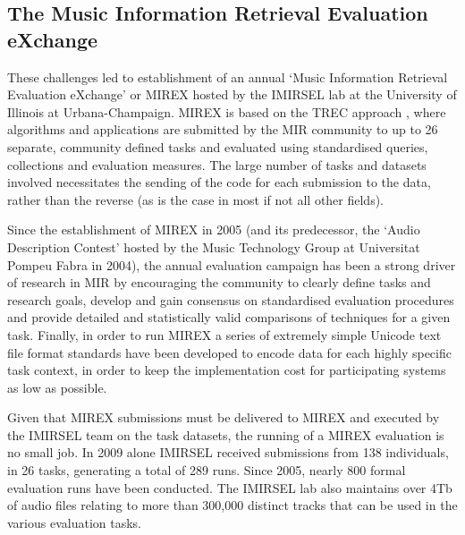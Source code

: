 \documentclass[conference]{IEEEtran}
\begin{document}
\subsection{The Music Information Retrieval Evaluation eXchange}
These challenges led to establishment of an annual `Music Information Retrieval Evaluation eXchange'  or MIREX  \cite{downie2008mirex} hosted by the IMIRSEL lab at the University of Illinois at Urbana-Champaign. MIREX is based on the TREC approach \cite{taguesutcliffe1995sat}, where algorithms and applications are submitted by the MIR community to up to 26 separate, community defined tasks and evaluated using standardised queries, collections and evaluation measures. 
The large number of tasks and datasets involved necessitates the sending of the code for each submission to the data, rather than the reverse (as is the case in most if not all other fields). 

Since the establishment of MIREX in 2005 (and its predecessor, the `Audio Description Contest' hosted by the Music Technology Group at Universitat Pompeu Fabra in 2004), the annual evaluation campaign has been a strong driver of research in MIR by encouraging the community to clearly define tasks and research goals, develop and gain consensus on standardised evaluation procedures and provide detailed and statistically valid comparisons of techniques for a given task. Finally, in order to run MIREX a series of extremely simple Unicode text file format standards have been developed to encode data for each highly specific task context, in order to keep the implementation cost for participating systems as low as possible.

Given that MIREX submissions must be delivered to MIREX and executed by the IMIRSEL team on the task datasets, the running of a MIREX evaluation is no small job. In 2009 alone IMIRSEL received submissions from 138 individuals, in 26 tasks, generating a total of 289 runs.  Since 2005, nearly 800 formal evaluation runs have been conducted. The IMIRSEL lab also maintains over 4Tb of audio files relating to more than 300,000 distinct tracks that can be used in the various evaluation tasks.
\end{document}
